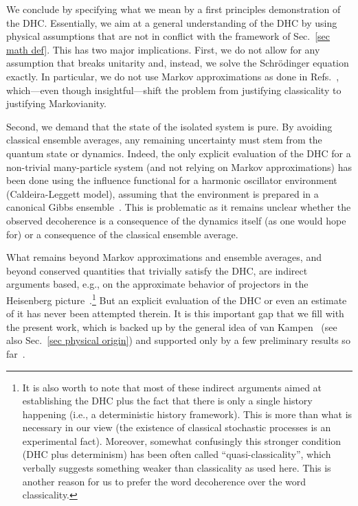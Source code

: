 \documentclass[pre,onecolumn,12pt,aps,longbibliography,nofootinbib]{revtex4-2}
\begin{document}
We conclude by specifying what we mean by a {first principles} demonstration of the DHC. Essentially, we aim at a general understanding of the DHC by using physical assumptions that are not in conflict with the framework of Sec.~\ref{sec math def}. This has two major implications. First, we do not allow for any assumption that breaks unitarity and, instead, we solve the Schr\"odinger equation exactly. In particular, we do not use Markov approximations as done in Refs.~\cite{PazZurekPRD1993, DiosiEtAlPRL1995, BrunPRL1997, YuPA1998, BrunPRA2000, SmirneEtAlQST2018, StrasbergDiazPRA2019, MilzEtAlPRX2020, StrasbergSP2023}, which---even though insightful---shift the problem from justifying classicality to justifying Markovianity.

Second, we demand that the state of the isolated system is pure. By avoiding classical ensemble averages, any remaining uncertainty must stem from the quantum state or dynamics. Indeed, the only explicit evaluation of the DHC for a non-trivial many-particle system (and not relying on Markov approximations) has been done using the influence functional for a harmonic oscillator environment (Caldeira-Leggett model), {assuming} that the environment is prepared in a canonical Gibbs ensemble~\cite{SchmidAP1987, DowkerHalliwellPRD1992, GellMannHartlePRD1993, HalliwellPRD1999, HalliwellPRD2001, SubasiHuPRE2012}. This is problematic as it remains unclear whether the observed decoherence is a consequence of the dynamics itself (as one would hope for) or a consequence of the classical ensemble average.

What remains beyond Markov approximations and ensemble averages, and beyond conserved quantities that trivially satisfy the DHC, are indirect arguments based, e.g., on the approximate behavior of projectors in the Heisenberg picture~\cite{OmnesJSP1989, OmnesRMP1992, GellMannHartlePRD1993, BrunHalliwellPRD1996, HalliwellPRD1998, HalliwellPRL1999, CalzettaHuPRD1999, HalliwellPRD2003, GellMannHartlePRA2007, HalliwellInBook2010}.\footnote{It is also worth to note that most of these indirect arguments aimed at establishing the DHC {plus} the fact that there is only a single history happening (i.e., a deterministic history framework). This is more than what is necessary in our view (the existence of classical stochastic processes is an experimental fact). Moreover, somewhat confusingly this {stronger} condition (DHC plus determinism) has been often called ``quasi-classicality'', which verbally suggests something {weaker} than classicality as used here. This is another reason for us to prefer the word decoherence over the word classicality. } But an explicit evaluation of the DHC or even an estimate of it has never been attempted therein. It is this important gap that we fill with the present work, which is backed up by the general idea of van Kampen~\cite{VanKampenPhys1954} (see also Sec.~\ref{sec physical origin}) and supported only by a few preliminary results so far~\cite{GemmerSteinigewegPRE2014, SchmidtkeGemmerPRE2016, NationPorrasPRE2020, StrasbergEtAlPRA2023, StrasbergSP2023}.
\end{document}
